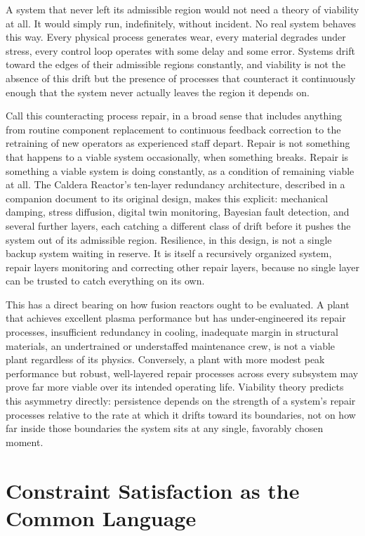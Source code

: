 A system that never left its admissible region would not need a theory of viability at all. It would simply run, indefinitely, without incident. No real system behaves this way. Every physical process generates wear, every material degrades under stress, every control loop operates with some delay and some error. Systems drift toward the edges of their admissible regions constantly, and viability is not the absence of this drift but the presence of processes that counteract it continuously enough that the system never actually leaves the region it depends on.

Call this counteracting process repair, in a broad sense that includes anything from routine component replacement to continuous feedback correction to the retraining of new operators as experienced staff depart. Repair is not something that happens to a viable system occasionally, when something breaks. Repair is something a viable system is doing constantly, as a condition of remaining viable at all. The Caldera Reactor's ten-layer redundancy architecture, described in a companion document to its original design, makes this explicit: mechanical damping, stress diffusion, digital twin monitoring, Bayesian fault detection, and several further layers, each catching a different class of drift before it pushes the system out of its admissible region. Resilience, in this design, is not a single backup system waiting in reserve. It is itself a recursively organized system, repair layers monitoring and correcting other repair layers, because no single layer can be trusted to catch everything on its own.

This has a direct bearing on how fusion reactors ought to be evaluated. A plant that achieves excellent plasma performance but has under-engineered its repair processes, insufficient redundancy in cooling, inadequate margin in structural materials, an undertrained or understaffed maintenance crew, is not a viable plant regardless of its physics. Conversely, a plant with more modest peak performance but robust, well-layered repair processes across every subsystem may prove far more viable over its intended operating life. Viability theory predicts this asymmetry directly: persistence depends on the strength of a system's repair processes relative to the rate at which it drifts toward its boundaries, not on how far inside those boundaries the system sits at any single, favorably chosen moment.

\section{Constraint Satisfaction as the Common Language}

